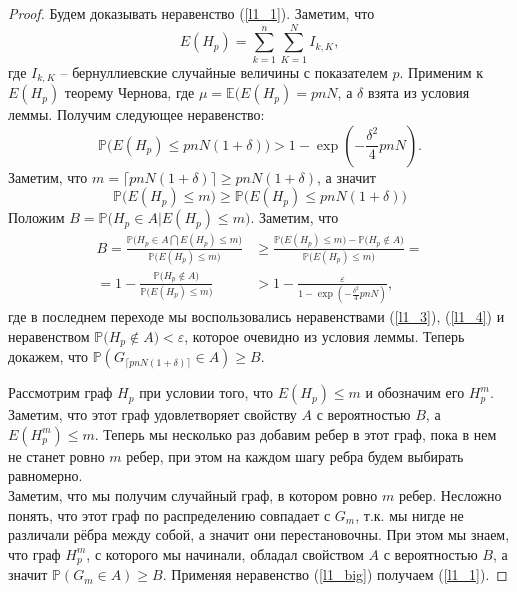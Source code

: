 \documentclass[10pt]{article}
\newcommand{\Expect}{\mathbb E}
\newcommand{\PRob}{\mathbb P}
\newcommand{\leqs}{\leqslant}
\newcommand{\geqs}{\geqslant}
\newcommand{\eps}{\varepsilon}
\theoremstyle{named}
\begin{document}
\begin{proof}
Будем доказывать неравенство (\ref{l1_1}). Заметим, что 
\begin{equation}
E(H_p) = \sum_{k=1}^n \sum_{K=1}^N I_{k, K},
\end{equation}
где $I_{k,K}$ -- бернуллиевские случайные величины с показателем $p$.
Применим к $E(H_p)$ теорему Чернова, где $\mu = \Expect(E(H_p) = pnN$, а $\delta$ взята из условия леммы.
Получим следующее неравенство:
\begin{equation}\label{l1_3}
\PRob\big( E(H_p) \leqs pnN(1+\delta) \big) > 1 - \exp\left(-\frac{\delta^2}{4}pnN\right).
\end{equation}
Заметим, что $m = \lceil pnN(1+\delta) \rceil \geqs pnN(1+\delta)$, а значит
\begin{equation}\label{l1_4}
\PRob\big( E(H_p) \leqs m \big) \geqs \PRob\big( E(H_p) \leqs pnN(1+\delta) \big)
\end{equation}
Положим $B = \PRob\Big( H_p \in A \big| E(H_p) \leqs m \Big)$. Заметим, что
\begin{equation}\label{l1_big}
\begin{aligned}
B = \frac{
		\PRob\Big( H_p \in A \bigcap E(H_p) \leqs m \Big)
	}{
		\PRob\big(E(H_p) \leqs m \big)
	} 
&\geqs 
	\frac{
		\PRob\big(E(H_p) \leqs m \big) 
			-
		\PRob\big(H_p \not\in A \big)
	}{
		\PRob\big(E(H_p) \leqs m\big)
	}
=
\\
=
	1 
		-
	\frac{
		\PRob\big(H_p \not\in A \big)
	}{
		\PRob\big(E(H_p) \leqs m\big)
	}
&>
	1
		-
	\frac{\eps}{
		1 - \exp\left(-\frac{\delta^2}{4}pnN\right)
	},
\end{aligned}\end{equation}
где в последнем переходе мы воспользовались неравенствами (\ref{l1_3}), (\ref{l1_4}) 
и неравенством $\PRob\big(H_p \not\in A \big) < \eps$, которое очевидно из условия леммы.
Теперь докажем, что $\PRob(G_{\lceil pnN(1+\delta) \rceil} \in A) \geqs B$.

Рассмотрим граф $H_p$ при условии того, что $E(H_p) \leqs m$ и обозначим его $H_p^m$. 
Заметим, что этот граф удовлетворяет свойству $A$ с вероятностью $B$, а $E(H_p^m) \leqs m$.
Теперь мы несколько раз добавим ребер в этот граф, пока в нем не станет ровно $m$ ребер, 
при этом на каждом шагу ребра будем выбирать равномерно.
\\
Заметим, что мы получим случайный граф, в котором ровно $m$ ребер. Несложно понять, 
что этот граф по распределению совпадает с $G_m$, т.к. мы нигде не различали рёбра между собой, а значит они перестановочны.
При этом мы знаем, что граф $H_p^m$, с которого мы начинали, обладал свойством $A$ с вероятностью $B$, 
а значит $\PRob(G_m \in A) \geqs B$. Применяя неравенство (\ref{l1_big}) получаем (\ref{l1_1}).


\end{proof}
\end{document}
